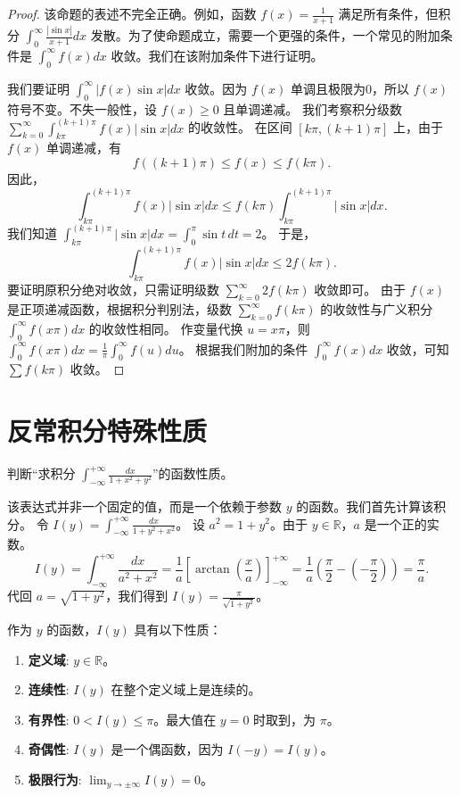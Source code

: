 \documentclass[lang=cn,10pt,thmcnt=section]{elegantbook}
\begin{document}
\begin{proof}
		该命题的表述不完全正确。例如，函数 $f(x)=\frac{1}{x+1}$ 满足所有条件，但积分 $\int_0^\infty \frac{|\sin x|}{x+1} dx$ 发散。为了使命题成立，需要一个更强的条件，一个常见的附加条件是 $\int_0^\infty f(x) dx$ 收敛。我们在该附加条件下进行证明。
	
		我们要证明 $\int_0^\infty |f(x)\sin x| dx$ 收敛。因为 $f(x)$ 单调且极限为0，所以 $f(x)$ 符号不变。不失一般性，设 $f(x) \ge 0$ 且单调递减。
		我们考察积分级数 $\sum_{k=0}^\infty \int_{k\pi}^{(k+1)\pi} f(x)|\sin x| dx$ 的收敛性。
		在区间 $[k\pi, (k+1)\pi]$ 上，由于 $f(x)$ 单调递减，有
		\[
		f((k+1)\pi) \le f(x) \le f(k\pi).
		\]
		因此，
		\[
		\int_{k\pi}^{(k+1)\pi} f(x)|\sin x| dx \le f(k\pi) \int_{k\pi}^{(k+1)\pi} |\sin x| dx.
		\]
		我们知道 $\int_{k\pi}^{(k+1)\pi} |\sin x| dx = \int_0^\pi \sin t \, dt = 2$。
		于是，
		\[
		\int_{k\pi}^{(k+1)\pi} f(x)|\sin x| dx \le 2f(k\pi).
		\]
		要证明原积分绝对收敛，只需证明级数 $\sum_{k=0}^\infty 2f(k\pi)$ 收敛即可。
		由于 $f(x)$ 是正项递减函数，根据积分判别法，级数 $\sum_{k=0}^\infty f(k\pi)$ 的收敛性与广义积分 $\int_0^\infty f(x\pi) dx$ 的收敛性相同。
		作变量代换 $u=x\pi$，则 $\int_0^\infty f(x\pi) dx = \frac{1}{\pi} \int_0^\infty f(u) du$。
		根据我们附加的条件 $\int_0^\infty f(x) dx$ 收敛，可知 $\sum f(k\pi)$ 收敛。
		
\end{proof}
\section{反常积分特殊性质}
\begin{example}
    判断“求积分 \(\int_{-\infty}^{+\infty} \frac{dx}{1 + x^2 + y^2}\)”的函数性质。
\end{example}
\begin{solution}
    该表达式并非一个固定的值，而是一个依赖于参数 $y$ 的函数。我们首先计算该积分。
    令 $I(y) = \int_{-\infty}^{+\infty} \frac{dx}{1 + y^2 + x^2}$。
    设 $a^2 = 1+y^2$。由于 $y \in \mathbb{R}$，$a$ 是一个正的实数。
    \[
    I(y) = \int_{-\infty}^{+\infty} \frac{dx}{a^2 + x^2} = \frac{1}{a} \left[ \arctan\left(\frac{x}{a}\right) \right]_{-\infty}^{+\infty} = \frac{1}{a} \left( \frac{\pi}{2} - \left(-\frac{\pi}{2}\right) \right) = \frac{\pi}{a}.
    \]
    代回 $a = \sqrt{1+y^2}$，我们得到 $I(y) = \frac{\pi}{\sqrt{1+y^2}}$。
    
    作为 $y$ 的函数，$I(y)$ 具有以下性质：
    \begin{enumerate}
        \item \textbf{定义域}: $y \in \mathbb{R}$。
        \item \textbf{连续性}: $I(y)$ 在整个定义域上是连续的。
        \item \textbf{有界性}: $0 < I(y) \le \pi$。最大值在 $y=0$ 时取到，为 $\pi$。
        \item \textbf{奇偶性}: $I(y)$ 是一个偶函数，因为 $I(-y) = I(y)$。
        \item \textbf{极限行为}: $\lim_{y \to \pm\infty} I(y) = 0$。
    \end{enumerate}
\end{solution}
\end{document}
